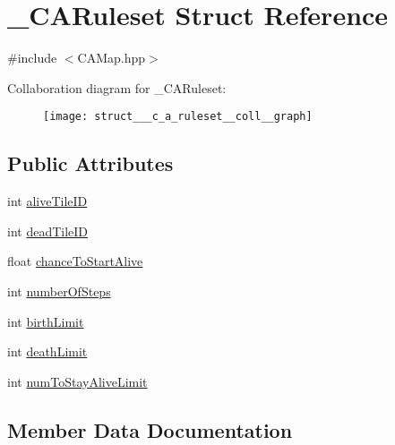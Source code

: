 \hypertarget{struct___c_a_ruleset}{}\section{\+\_\+\+C\+A\+Ruleset Struct Reference}
\label{struct___c_a_ruleset}


{\ttfamily \#include $<$C\+A\+Map.\+hpp$>$}



Collaboration diagram for \+\_\+\+C\+A\+Ruleset\+:
\nopagebreak
\begin{figure}[H]
\begin{center}
\leavevmode
\texttt{[image: struct\_\_\_c\_a\_ruleset\_\_coll\_\_graph]}
\end{center}
\end{figure}
\subsection*{Public Attributes}
\begin{DoxyCompactItemize}
\item 
int \mbox{\hyperlink{struct___c_a_ruleset_a337222bac7553157120b52380f58d570}{alive\+Tile\+ID}}
\item 
int \mbox{\hyperlink{struct___c_a_ruleset_a6d57373433d4eb5236bbeac8bb6f464f}{dead\+Tile\+ID}}
\item 
float \mbox{\hyperlink{struct___c_a_ruleset_afeb8028018113d49b14b5e19f7287d76}{chance\+To\+Start\+Alive}}
\item 
int \mbox{\hyperlink{struct___c_a_ruleset_ac2f4cb85d2b3e775e33eaed281a92b2d}{number\+Of\+Steps}}
\item 
int \mbox{\hyperlink{struct___c_a_ruleset_ab00fdee694e9ffe768885de7e5deb47e}{birth\+Limit}}
\item 
int \mbox{\hyperlink{struct___c_a_ruleset_a421ce30ec54473bec500e3374911637c}{death\+Limit}}
\item 
int \mbox{\hyperlink{struct___c_a_ruleset_a8af594e5e229ec31c0ef86b9bf214401}{num\+To\+Stay\+Alive\+Limit}}
\end{DoxyCompactItemize}


\subsection{Member Data Documentation}
\mbox{\label{struct___c_a_ruleset_a337222bac7553157120b52380f58d570}} 
